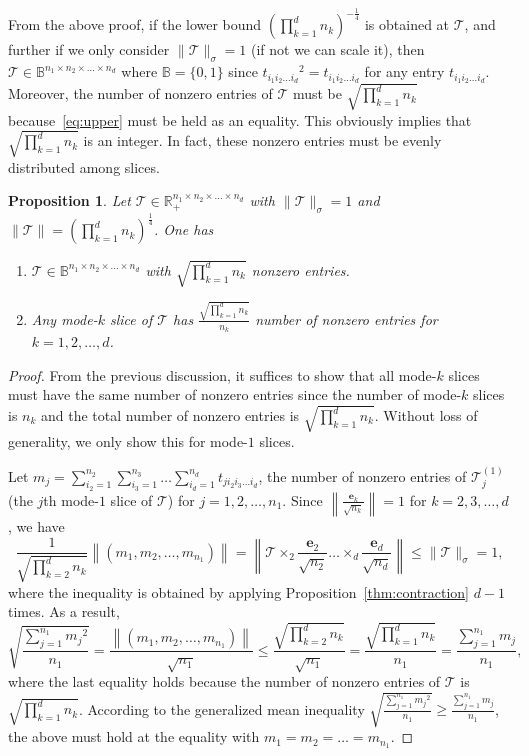 \documentclass[11pt]{article}
\newtheorem{proposition}[theorem]{Proposition}
\newcommand{\BB}{\mathbb{B}}
\newcommand{\R}{\mathbb{R}}
\newcommand{\TT}{\mathcal{T}}
\newcommand{\be}{\boldsymbol{e}}
\begin{document}
From the above proof, if the lower bound $\left(\prod_{k=1}^dn_k\right)^{-\frac{1}{4}}$ is obtained at $\TT$, and further if we only consider $\|\TT\|_\sigma=1$ (if not we can scale it), then $\TT\in\BB^{n_1\times n_2\times \dots\times n_d}$ where $\BB=\{0,1\}$ since ${t_{i_1i_2\dots i_d}}^2=t_{i_1i_2\dots i_d}$ for any entry $t_{i_1i_2\dots i_d}$. Moreover, the number of nonzero entries of $\TT$ must be $\sqrt{\prod_{k=1}^dn_k}$ because~\eqref{eq:upper} must be held as an equality. This obviously implies that $\sqrt{\prod_{k=1}^dn_k}$ is an integer. In fact, these nonzero entries must be evenly distributed among slices.

\begin{proposition}\label{thm:evenly}
Let $\TT\in\R_+^{n_1\times n_2\times \dots\times n_d}$ with $\|\TT\|_\sigma=1$ and $\|\TT\|=\left(\prod_{k=1}^dn_k\right)^{\frac{1}{4}}$. One has
\begin{enumerate}
\item $\TT\in\BB^{n_1\times n_2\times \dots\times n_d}$ with $\sqrt{\prod_{k=1}^dn_k}$ nonzero entries.
\item Any mode-$k$ slice of $\TT$ has $\frac{\sqrt{\prod_{k=1}^dn_k}}{n_k}$ number of nonzero entries for $k=1,2,\dots,d$.
\end{enumerate}
\end{proposition}
\begin{proof}
From the previous discussion, it suffices to show that all mode-$k$ slices must have the same number of nonzero entries since the number of mode-$k$ slices is $n_k$ and the total number of nonzero entries is $\sqrt{\prod_{k=1}^dn_k}$. Without loss of generality, we only show this for mode-$1$ slices.

Let $m_j=\sum_{i_2=1}^{n_2}\sum_{i_3=1}^{n_3}\dots\sum_{i_d=1}^{n_d}t_{ji_2i_3\dots i_d}$, the number of nonzero entries of $\TT^{(1)}_j$ (the $j$th mode-$1$ slice of $\TT$) for $j=1,2,\dots,n_1$. Since $\left\|\frac{\be_k}{\sqrt{n_k}}\right\|=1$ for $k=2,3,\dots,d$, we have
$$
\frac{1}{\sqrt{\prod_{k=2}^dn_k}} \left\|(m_1,m_2,\dots,m_{n_1})\right\|
= \left\|\TT\times_2 \frac{\be_2}{\sqrt{n_2}} \dots \times_d \frac{\be_d}{\sqrt{n_d}}\right\| \le\|\TT\|_\sigma =1,
$$
where the inequality is obtained by applying Proposition~\ref{thm:contraction} $d-1$ times. As a result,
$$
\sqrt{\frac{\sum_{j=1}^{n_1}{m_j}^2}{n_1}} = \frac{\left\|(m_1,m_2,\dots,m_{n_1})\right\|}{\sqrt{n_1}} \le \frac{\sqrt{\prod_{k=2}^dn_k}}{\sqrt{n_1}} = \frac{\sqrt{\prod_{k=1}^dn_k}}{n_1} = \frac{\sum_{j=1}^{n_1}m_j}{n_1},
$$
where the last equality holds because the number of nonzero entries of $\TT$ is $\sqrt{\prod_{k=1}^dn_k}$. According to the generalized mean inequality $\sqrt{\frac{\sum_{j=1}^{n_1}{m_j}^2}{n_1}}\ge\frac{\sum_{j=1}^{n_1}m_j}{n_1}$, the above must hold at the equality with $m_1=m_2=\dots=m_{n_1}$.
\end{proof}
\end{document}
